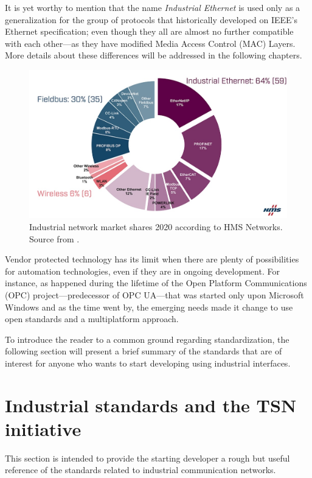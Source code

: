 It is yet worthy to mention that the name \emph{Industrial Ethernet} is used only as a 
generalization for the group of protocols that historically developed on IEEE's Ethernet specification; even though they all are almost no further
compatible with each other---as they have modified Media Access Control (MAC) Layers. More details about these differences will be addressed in the following chapters.  

\begin{figure}[h]
    \centering
    \includegraphics[width=.8\textwidth]{imgs/intro-buses-share.jpg}
    \caption{Industrial network market shares 2020 according to HMS Networks. Source from \cite{fieldbus_shares}.} %
    \label{fig:fieldbus_shares}
\end{figure}

Vendor protected technology has its limit when there are plenty of possibilities for automation technologies, even if they are in ongoing development. 
For instance, as happened during the lifetime of the Open Platform Communications (OPC) project---predecessor of OPC UA---that was started only upon Microsoft Windows and 
as the time went by, the emerging needs made it change to use open standards and a multiplatform approach.

To introduce the reader to a common ground regarding standardization, the following section will present a brief summary of the standards that 
are of interest for anyone who wants to start developing using industrial interfaces.

\section{Industrial standards and the TSN initiative}\label{sec:standards} 

This section is intended to provide the starting developer a rough but useful reference of the standards related to industrial 
communication networks. 

